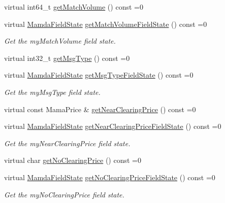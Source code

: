 \begin{CompactItemize}
virtual int64\_\-t \hyperlink{classWombat_1_1MamdaOrderImbalanceRecap_2d983f66653cb0ca55dc88093794d850}{get\-Match\-Volume} () const =0
\item 
virtual \hyperlink{namespaceWombat_93aac974f2ab713554fd12a1fa3b7d2a}{Mamda\-Field\-State} \hyperlink{classWombat_1_1MamdaOrderImbalanceRecap_f634674460d3c12123544852fcda939c}{get\-Match\-Volume\-Field\-State} () const =0
\begin{CompactList}\small\item\em Get the my\-Match\-Volume field state. \item\end{CompactList}\item 
virtual int32\_\-t \hyperlink{classWombat_1_1MamdaOrderImbalanceRecap_45cda967241f1a5ff39a115c1395d06b}{get\-Msg\-Type} () const =0
\item 
virtual \hyperlink{namespaceWombat_93aac974f2ab713554fd12a1fa3b7d2a}{Mamda\-Field\-State} \hyperlink{classWombat_1_1MamdaOrderImbalanceRecap_458ec8a6c2f84a218af924a747f1a410}{get\-Msg\-Type\-Field\-State} () const =0
\begin{CompactList}\small\item\em Get the my\-Msg\-Type field state. \item\end{CompactList}\item 
virtual const Mama\-Price \& \hyperlink{classWombat_1_1MamdaOrderImbalanceRecap_b9c9fff21f52344038f8b2aca1a5e672}{get\-Near\-Clearing\-Price} () const =0
\item 
virtual \hyperlink{namespaceWombat_93aac974f2ab713554fd12a1fa3b7d2a}{Mamda\-Field\-State} \hyperlink{classWombat_1_1MamdaOrderImbalanceRecap_dd69e2d456848710dbeff6a835c2b3ce}{get\-Near\-Clearing\-Price\-Field\-State} () const =0
\begin{CompactList}\small\item\em Get the my\-Near\-Clearing\-Price field state. \item\end{CompactList}\item 
virtual char \hyperlink{classWombat_1_1MamdaOrderImbalanceRecap_448c70dec05ba4ec25e00cb497310cb8}{get\-No\-Clearing\-Price} () const =0
\item 
virtual \hyperlink{namespaceWombat_93aac974f2ab713554fd12a1fa3b7d2a}{Mamda\-Field\-State} \hyperlink{classWombat_1_1MamdaOrderImbalanceRecap_51b77c591dfe229e9c977d1c72e93536}{get\-No\-Clearing\-Price\-Field\-State} () const =0
\begin{CompactList}\small\item\em Get the my\-No\-Clearing\-Price field state. \item\end{CompactList}\item 

\end{CompactItemize}
